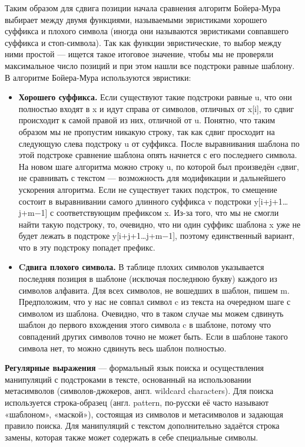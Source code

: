 \documentclass[12pt, a4paper]{article}
\begin{document}
Таким образом для сдвига позиции начала сравнения алгоритм Бойера-Мура выбирает между двумя функциями, называемыми эвристиками хорошего суффикса и плохого символа (иногда они называются эвристиками совпавшего суффикса и стоп-символа). Так как функции эвристические, то выбор между ними простой — ищется такое итоговое значение, чтобы мы не проверяли максимальное число позиций и при этом нашли все подстроки равные шаблону.\\

В алгоритме Бойера-Мура используются эвристики:

\begin{itemize}
    \item \textbf{Хорошего суффикса.} Если существуют такие подстроки равные u, что они полностью входят в x и идут справа от символов, отличных от x[i], то сдвиг происходит к самой правой из них, отличной от u. Понятно, что таким образом мы не пропустим никакую строку, так как сдвиг просходит на следующую слева подстроку u от суффикса. После выравнивания шаблона по этой подстроке сравнение шаблона опять начнется с его последнего символа. На новом шаге алгоритма можно строку u, по которой был произведён cдвиг, не сравнивать с текстом — возможность для модификации и дальнейшего ускорения алгоритма. Если не существует таких подстрок, то смещение состоит в выравнивании самого длинного суффикса v подстроки y[i+j+1…j+m−1] с соответствующим префиксом x. Из-за того, что мы не смогли найти такую подстроку, то, очевидно, что ни один суффикс шаблона x уже не будет лежать в подстроке y[i+j+1…j+m−1], поэтому единственный вариант, что в эту подстроку попадет префикс.
    \item \textbf{Cдвига плохого символа.} В таблице плохих символов указывается последняя позиция в шаблоне (исключая последнюю букву) каждого из символов алфавита. Для всех символов, не вошедших в шаблон, пишем m. Предположим, что у нас не совпал символ c из текста на очередном шаге с символом из шаблона. Очевидно, что в таком случае мы можем сдвинуть шаблон до первого вхождения этого символа c в шаблоне, потому что совпадений других символов точно не может быть. Если в шаблоне такого символа нет, то можно сдвинуть весь шаблон полностью.
\end{itemize}

\textbf{Регулярные выражения} --- формальный язык поиска и осуществления манипуляций с подстроками в тексте, основанный на использовании метасимволов (символов-джокеров, англ. wildcard characters). Для поиска используется строка-образец (англ. pattern, по-русски её часто называют «шаблоном», «маской»), состоящая из символов и метасимволов и задающая правило поиска. Для манипуляций с текстом дополнительно задаётся строка замены, которая также может содержать в себе специальные символы.
\end{document}
